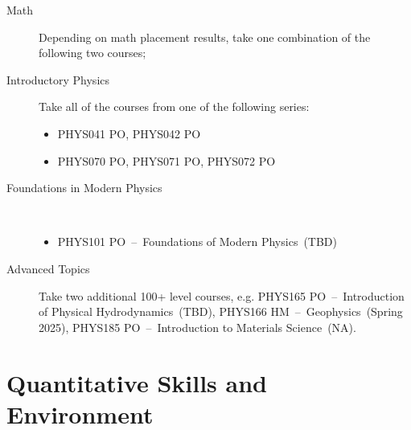 \documentclass{article}\usepackage[]{graphicx}\usepackage[]{xcolor}
\newenvironment{itemize*}%
  {\begin{itemize}%
    \setlength{\itemsep}{0pt}%
    \setlength{\parskip}{0pt}}%
  {\end{itemize}}
\begin{document}
\begin{description}
  \item[Math] Depending on math placement results, take one combination of the following two courses; 
  

  
  \item[Introductory Physics] Take all of the courses from one of the following series: 
  \begin{itemize}
  \item PHYS041 PO, PHYS042 PO
  \item PHYS070 PO, PHYS071 PO, PHYS072  PO
\end{itemize}
 
  \item[Foundations in Modern Physics]
~~
  \begin{itemize}
  \item PHYS101 PO~--~Foundations of Modern Physics~(TBD)
\end{itemize}


  \item[Advanced Topics] Take two additional 100+ level courses, e.g. PHYS165 PO~--~Introduction of Physical Hydrodynamics~(TBD), PHYS166 HM~--~Geophysics~(Spring 2025), PHYS185 PO~--~Introduction to Materials Science~(NA). 
  
\end{description}



\clearpage
\newpage %
\section{Quantitative Skills and Environment}
\end{document}
